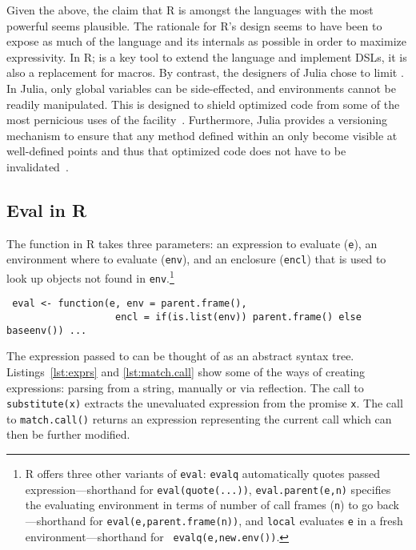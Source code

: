 \documentclass[review,screen,acmsmall]{acmart}%
\renewcommand{\k}[1]{\lstinline |#1|\xspace}
\begin{document}
Given the above, the claim that R is amongst the languages with the most
powerful \eval seems plausible. The rationale for R's design seems to have been
to expose as much of the language and its internals as possible in order to
maximize expressivity. In R; \eval is a key tool to extend the language and
implement DSLs, it is also a replacement for macros. By contrast, the designers
of Julia chose to limit \eval. In Julia, only global variables can be
side-effected, and environments cannot be readily manipulated. This is designed
to shield optimized code from some of the most pernicious uses of the
facility~\cite{oopsla18a}. Furthermore, Julia provides a versioning mechanism to
ensure that any method defined within an \eval only become visible at
well-defined points and thus that optimized code does not have to be
invalidated~\cite{oopsla20a}.

\subsection{Eval in R}\label{sec:eval-in-r}

The \eval function in R takes three parameters: an expression to evaluate
(\k{e}), an environment where to evaluate (\k{env}), and an enclosure (\k{encl})
that is used to look up objects not found in \k{env}.\footnote{R offers three
other variants of {\tt eval}: {\tt evalq} automatically quotes passed
expression---shorthand for {\tt eval(quote(...))}, {\tt eval.parent(e,n)}
specifies the evaluating environment in terms of number of call frames ({\tt n})
to go back---shorthand for {\tt eval(e,parent.frame(n))}, and {\tt local}
evaluates {\tt e} in a fresh environment---shorthand for {\tt
  evalq(e,new.env())}.}

\begin{lstlisting}
 eval <- function(e, env = parent.frame(),
                   encl = if(is.list(env)) parent.frame() else baseenv()) ...
\end{lstlisting}

The expression passed to \eval can be thought of as an abstract syntax tree.
Listings~\ref{lst:exprs} and \ref{lst:match.call} show some of the ways of
creating expressions: parsing from a string, manually or via reflection. The
call to \k{substitute(x)} extracts the unevaluated expression from the promise
\k{x}. The call to \k{match.call()} returns an expression representing the
current call which can then be further modified.
\end{document}
